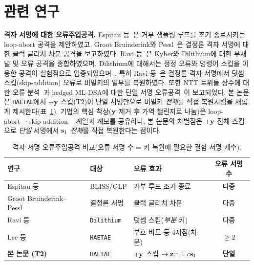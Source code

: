 \section{관련 연구}
\label{sec:related}

\textbf{격자 서명에 대한 오류주입공격.} Espitau 등~\cite{espitau2016}은 거부 샘플링 루프를 조기
종료시키는 loop-abort 공격을 제안하였고, Groot Bruinderink와 Pessl~\cite{bruinderink2018}은 결정론
격자 서명에 대한 클럭 글리치 차분 공격을 보고하였다. Ravi 등~\cite{ravi2022survey}은 Kyber와
Dilithium에 대한 부채널 및 오류 공격을 종합하였으며, Dilithium에 대해서는 정정 오류와 명령어 스킵을
이용한 공격이 실험적으로 입증되었으며~\cite{krahmer2024,elghamrawy2023}, 특히 Ravi
등~\cite{ravi2019determinism}은 결정론 격자 서명에서 덧셈 스킵(skip-addition) 오류로 비밀키의
일부를 복원하였다. 또한 NTT 트위들 상수에 대한 오류 분석~\cite{ravi2023ntt}과 hedged ML-DSA에 대한
단일 서명 오류공격~\cite{jendral2024}이 보고되었다. 본 논문은 \texttt{HAETAE}에서 $+\mathbf{y}$
스킵(T2)이 단일 서명만으로 비밀키 \emph{전체}를 직접 복원시킴을 새롭게 제시한다(표~\ref{tab:attack-compare}).
기법의 핵심 착상($\mathbf{y}$ 제거 후 가역 챌린지로 나눔)은 loop-abort~\cite{espitau2016}·skip-addition
~\cite{ravi2019determinism} 계열과 계보를 공유하나, 본 논문의 차별점은 $+\mathbf{y}$ 전체 스킵으로
\emph{단일} 서명에서 $\mathbf{s}_1$ \emph{전체}를 직접 복원한다는 점이다.

\begin{table}[H]\centering
\caption{격자 서명 오류주입공격 비교(오류 서명 수 = 키 복원에 필요한 결함 서명 개수).}
\label{tab:attack-compare}
\small
\begin{tabular}{@{}lllc@{}}
\toprule
연구 & 대상 & 오류 효과 & 오류 서명 수 \\
\midrule
Espitau 등~\cite{espitau2016}             & BLISS/GLP          & 거부 루프 조기 종료          & 다중 \\
Groot Bruinderink--Pessl~\cite{bruinderink2018} & 결정론 서명   & 클럭 글리치 차분             & 다중 \\
Ravi 등~\cite{ravi2019determinism}        & \texttt{Dilithium} & 덧셈 스킵(\emph{부분} 키)    & 다중 \\
Lee 등~\cite{lee2026haetae}               & \texttt{HAETAE}    & 부호 비트 등 4지점(차분)     & $\ge 2$ \\
\textbf{본 논문 (T2)}                     & \texttt{HAETAE}    & $+\mathbf{y}$ 스킵 $\to \mathbf{z}{=}\pm c\mathbf{s}_1$ & \textbf{단일} \\
\bottomrule
\end{tabular}
\end{table}

